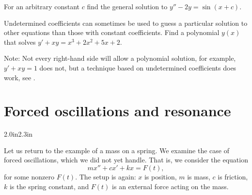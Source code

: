 \begin{exercise}
For an arbitrary constant $c$ find the general solution
to $y''-2y=\sin(x+c)$.
\end{exercise}

\begin{exercise}
Undetermined coefficients can sometimes be used to guess a particular solution
to other equations than those with constant coefficients.
Find a polynomial $y(x)$ that solves 
$y'+ x y = x^3+2x^2+5x+2$.

Note: 
Not every right-hand side will allow a polynomial solution,
for example, $y'+xy=1$ does not, but a technique based on undetermined
coefficients does work, see .
\end{exercise}




\sectionnewpage
\section{Forced oscillations and resonance} \label{forcedo:section}



\begin{mywrapfigsimp}{2.0in}{2.3in}
\noindent
{}
\end{mywrapfigsimp}
Let us return to the example of a mass on a spring.  We examine
the case of forced oscillations, which we did not yet handle.  That is, we consider the equation
\begin{equation*}
mx'' + cx' + kx = F(t) ,
\end{equation*}
for some nonzero $F(t)$.  The setup
is again: $x$ is position, $m$ is mass, $c$ is friction, $k$ is the spring constant, and
$F(t)$ is an external force acting on the mass.

